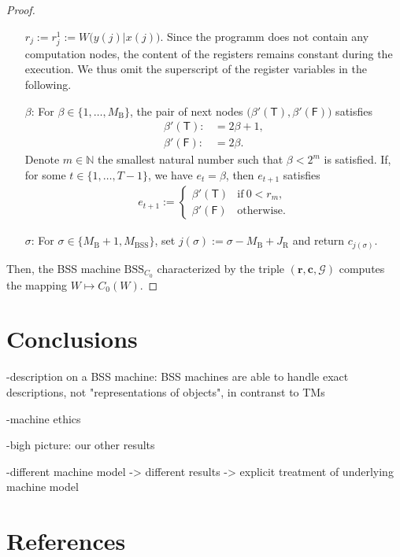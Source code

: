 \documentclass[conference]{IEEEtran}
\def\G{{\mathcal G}}
\def\NN{{\mathbb N}}
\newcommand{\BSS}{\mathrm{BSS}}
\begin{document}
\begin{proof}
\begin{enumerate}
											\(r_j := r^1_j := W\big(y(j)|x(j)\big)\). Since the programm does not contain any computation nodes,
											the content of the registers remains constant during the execution. We thus omit the superscript of the
											register variables in the following.
										\item[\(\beta\)\hspace{1pt}:] 
											For \(\beta \in \{1,\ldots, M_\mathrm{B}\}\), the pair of next nodes \(\big(\beta'(\mathsf{T}),\beta'(\mathsf{F})\big)\) satisfies
											\begin{align}   \beta'(\mathsf{T}) :    &=  2\beta + 1, \\
															\beta'(\mathsf{F}) :    &=  2\beta.
											\end{align}
											Denote \(m\in\NN\) the smallest natural number such that \(\beta < 2^m\) is satisfied. If, for some \(t\in\{1,\ldots, T-1\}\), we have
											\(e_t = \beta\), then \(e_{t+1}\) satisfies
											\begin{align}   e_{t+1} :=  \begin{cases}   \beta'(\mathsf{T}) &\text{if}~ 0 < r_m,\\
																						\beta'(\mathsf{F}) &\text{otherwise}.
																		\end{cases}
											\end{align}
										\item[\(\sigma\)\hspace{1pt}:] For \(\sigma \in \{M_\mathrm{B} +1, M_\BSS\}\), set \(j(\sigma) := \sigma - M_\mathrm{B} + J_\mathrm{R}\) 
											and return \(c_{j(\sigma)}\).
					\end{enumerate}
					Then, the BSS machine \(\BSS_{C_0}\) characterized by the triple \((\bm{r}, \bm{c}, \G)\) computes the mapping \(W\mapsto C_0(W)\).
	\end{proof}

\section{Conclusions}\label{Conclusions}

-description on a BSS machine: BSS machines are able to handle exact descriptions, not "representations of objects",
in contranst to TMs

-machine ethics

-bigh picture: our other results

-different machine model -> different results -> explicit treatment of underlying machine model




\section*{References}



\end{document}
